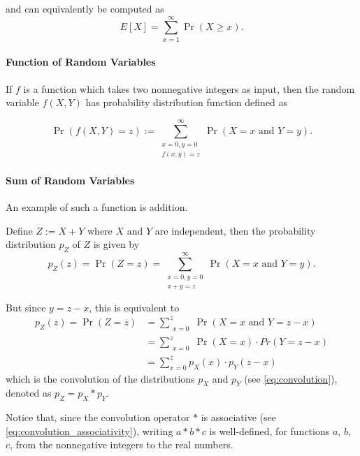 \documentclass{masterthesis}
\begin{document}
and can equivalently be computed as 
\begin{equation}
    E[X] = \sum_{x=1}^{\infty} \Pr(X \geq x).
\end{equation}

\paragraph*{Function of Random Variables}\label{paragraph:function_of_random_variables}
If $f$ is a function which takes two nonnegative integers as input, then the random variable $f(X, Y)$ has probability distribution function defined as

\begin{equation}
    \Pr(f(X, Y) = z) := \sum_{\substack{x=0, y=0 \\ f(x,y)=z}}^{\infty} \Pr(X = x \text{ and } Y = y).
\end{equation}

\paragraph*{Sum of Random Variables}\label{paragraph:sum_of_random_variables}
An example of such a function is addition. 

Define $Z := X+Y$ where $X$ and $Y$ are independent, then the probability distribution $p_Z$ of $Z$ is given by 
\begin{equation}
    p_Z(z) = \Pr(Z = z) = \sum_{\substack{x=0, y=0 \\ x+y=z}}^{\infty} \Pr(X = x \text{ and } Y = y).
\end{equation}

But since $y = z - x$, this is equivalent to
\begin{align}
    p_Z(z) = \Pr(Z = z) &= \sum_{\substack{x=0}}^{z} \Pr(X = x \text{ and } Y = z - x) \\ 
                        &= \sum_{\substack{x=0}}^{z} \Pr(X = x) \cdot Pr(Y = z - x) \\
                        &= \sum_{x=0}^{z} p_X(x) \cdot p_Y (z - x)
\end{align}
which is the convolution of the distributions $p_X$ and $p_Y$ (see \ref{eq:convolution}), denoted as $p_Z = p_X * p_Y$.

Notice that, since the convolution operator $*$ is associative (see \ref{eq:convolution_associativity}), writing $a * b * c$ is well-defined, for functions $a$, $b$, $c$, from the nonnegative integers to the real numbers.
\end{document}

